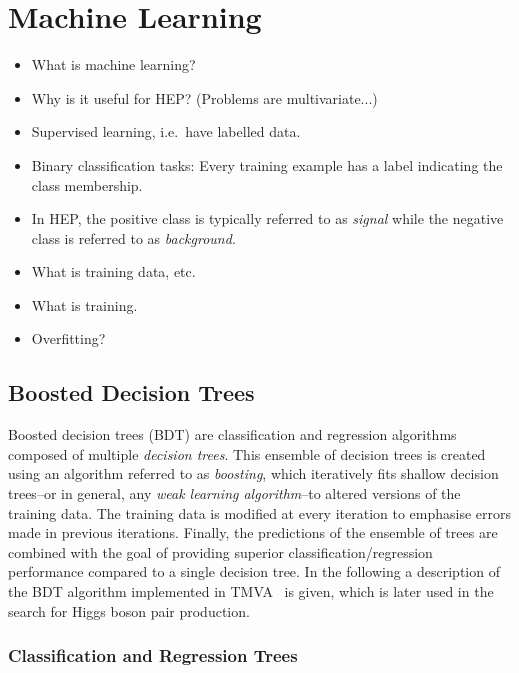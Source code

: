 \section{Machine Learning}

\begin{itemize}
\item What is machine learning?

\item Why is it useful for HEP? (Problems are multivariate...)

\item Supervised learning, i.e.\ have labelled data.

\item Binary classification tasks: Every training example has a label indicating
  the class membership.

\item In HEP, the positive class is typically referred to as \emph{signal} while
  the negative class is referred to as \emph{background}.

\item What is training data, etc.

\item What is training.

\item Overfitting?
\end{itemize}


\subsection{Boosted Decision Trees}

Boosted decision trees (BDT) are classification and regression algorithms
composed of multiple \emph{decision trees}. This ensemble of decision trees is
created using an algorithm referred to as \emph{boosting}, which iteratively
fits shallow decision trees--or in general, any \emph{weak learning
  algorithm}--to altered versions of the training data. The training data is
modified at every iteration to emphasise errors made in previous
iterations. Finally, the predictions of the ensemble of trees are combined with
the goal of providing superior classification/regression performance compared to
a single decision tree. In the following a description of the BDT algorithm
implemented in \textsc{TMVA}~\cite{TMVA} is given, which is later used in the
search for Higgs boson pair production.


\subsubsection{Classification and Regression Trees}

